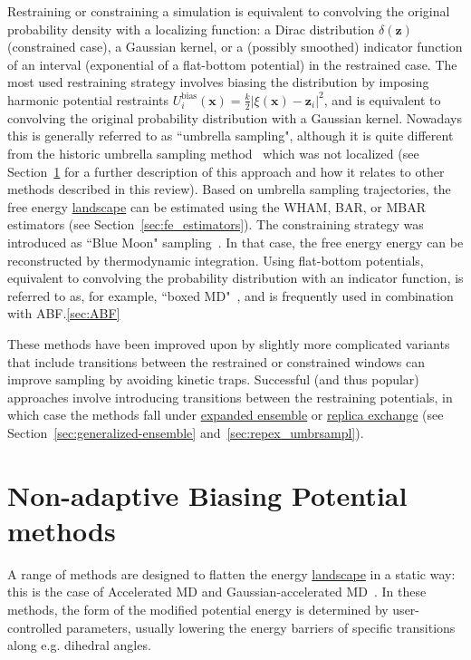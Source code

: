 \documentclass[9pt,review]{livecoms}
\newcommand{\vx}{\mathbf{x}}
\newcommand{\vz}{\mathbf{z}}
\begin{document}
Restraining or constraining a simulation is equivalent
to convolving the original probability density with a localizing function: a Dirac distribution $\delta(\vz)$ (constrained case),
a Gaussian kernel, or a (possibly smoothed) indicator function of an interval (exponential of a flat-bottom potential) in the restrained case.
The most used restraining strategy involves biasing the distribution by imposing harmonic potential restraints $U^{\mathrm{bias}}_i(\vx) = \frac{k}{2} |\xi(\vx)-\vz_i|^2$, and is equivalent to convolving the original probability distribution with a Gaussian kernel.
Nowadays this is generally referred to as ``umbrella sampling", although it is quite different from the historic umbrella sampling method~\cite{TORRIE1977187} which was not localized (see Section~\ref{sec:biasing_potential} for a further description of this approach and how it relates to other methods described in this review).
Based on umbrella sampling trajectories, the free energy \hyperlink{ref:FES} {landscape} can be estimated using the WHAM, BAR, or MBAR estimators (see Section~\ref{sec:fe_estimators}). The constraining strategy was introduced as ``Blue Moon" sampling~\cite{doi:10.1080/0892702042000270214}. In that case, the free energy energy can be reconstructed by thermodynamic integration. Using flat-bottom potentials, equivalent to convolving the probability distribution with an indicator function, is referred to as, for example, ``boxed MD"~\cite{doi:10.1021/jp9074898}, and is frequently used in combination with ABF.\ref{sec:ABF}

These methods have been improved upon by slightly more complicated variants that include transitions between the restrained or constrained windows can improve sampling by avoiding kinetic traps. Successful (and thus popular) approaches involve introducing transitions between the restraining potentials, in which case the methods fall under \hyperlink{ref:ExpEns} {expanded ensemble} or \hyperlink{ref:ReplEx} {replica exchange} (see Section~\ref{sec:generalized-ensemble} and~\ref{sec:repex_umbrsampl}).


\section{Non-adaptive Biasing Potential methods}
\label{sec:biasing_potential}

A range of methods are designed to flatten the energy \hyperlink{ref:FES} {landscape} in a static way: this is the case of Accelerated MD\cite{Hamelberg2004} and Gaussian-accelerated MD~\cite{Miao2017, Wang2021}.
In these methods, the form of the modified potential energy is determined by user-controlled parameters, usually lowering the energy barriers of specific transitions along e.g. dihedral angles.
\end{document}

